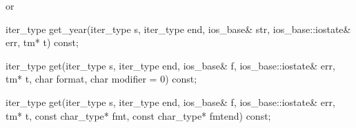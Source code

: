\begin{itemdescr}
\pnum
\returns
{}
or
\end{itemdescr}

%
\begin{itemdecl}
iter_type get_year(iter_type s, iter_type end, ios_base& str,
                   ios_base::iostate& err, tm* t) const;
\end{itemdecl}

\begin{itemdescr}
\pnum
\returns
{}
\end{itemdescr}

%
\begin{itemdecl}
iter_type get(iter_type s, iter_type end, ios_base& f,
    ios_base::iostate& err, tm* t, char format, char modifier = 0) const;
\end{itemdecl}

\begin{itemdescr}
\pnum
\returns {}
\end{itemdescr}

%
\begin{itemdecl}
iter_type get(iter_type s, iter_type end, ios_base& f,
    ios_base::iostate& err, tm* t, const char_type* fmt, const char_type* fmtend) const;
\end{itemdecl}


